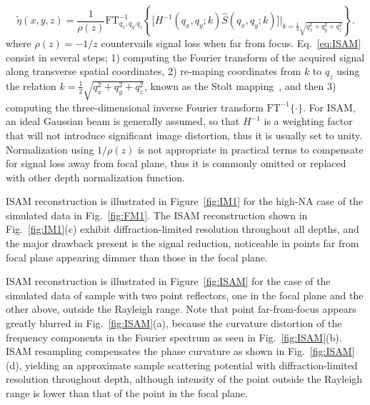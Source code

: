 \begin{equation}\label{eq:ISAM}
    \tilde{\eta}(x,y,z) = \frac{1}{\rho(z)} \text{FT}^{-1}_{q_x,q_y.q_z}\left\{\big[H^{-1}(q_x, q_y; k) \hat{S}(q_x, q_y; k)\big]\bigg|_{k = \frac{1}{2}\sqrt{q_x^2 + q_y^2 + q_z^ 2}}\right\}.
\end{equation}
where $\rho(z) = -1/z$ countervails signal loss when far from focus. Eq.~\ref{eq:ISAM} consist in several steps; 1) computing the Fourier transform of the acquired signal along transverse spatial coordinates, 2) re-maping coordinates from $k$ to $q_z$ using the relation $k = \frac{1}{2}\sqrt{q_x^2 + q_y^2 + q_z^2}$, known as the Stolt mapping~\cite{Stolt1978_Mitigation}, and then 3) computing the three-dimensional inverse Fourier transform $\text{FT}^{-1}\{\cdot\}$. For ISAM, an ideal Gaussian beam is generally assumed, so that $H^{-1}$ is a weighting factor that will not introduce significant image distortion, thus it is usually set to unity. Normalization using $1/\rho(z)$ is not appropriate in practical terms to compensate for signal loss away from focal plane, thus it is commonly omitted or replaced with other depth normalization function.

\iffalse
ISAM reconstruction is illustrated in Figure~\ref{fig:IM1} for the high-NA case of the simulated data in Fig.~\ref{fig:FM1}. The ISAM reconstruction shown in Fig.~\ref{fig:IM1}(c) exhibit diffraction-limited resolution throughout all depths, and the major drawback present is the signal reduction, noticeable in points far from focal plane appearing dimmer than those in the focal plane.

ISAM reconstruction is illustrated in Figure~\ref{fig:ISAM} for the case of the simulated data of sample with two point reflectors, one in the focal plane and the other above, outside the Rayleigh range. Note that point far-from-focus appears greatly blurred in Fig.~\ref{fig:ISAM}(a), because the curvature distortion of the frequency components in the Fourier spectrum as seen in Fig.~\ref{fig:ISAM}(b). ISAM resampling compensates the phase curvature as shown in Fig.~\ref{fig:ISAM}(d), yielding an approximate sample scattering potential with diffraction-limited resolution throughout depth, although intensity of the point outside the Rayleigh range is lower than that of the point in the focal plane.

